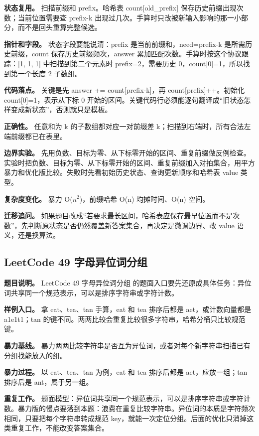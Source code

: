 \textbf{状态复用。} 扫描前缀和 prefix。哈希表 count[old\_prefix] 保存历史前缀出现次数；当前位置需要查 prefix-k 出现过几次。手算时只改被新输入影响的那一小部分，而不是回头重算完整候选。

\textbf{指针和字段。} 状态字段要能说清：prefix 是当前前缀和，need=prefix-k 是所需历史前缀，count 保存历史前缀频次，answer 累加匹配次数。手算时按这个协议跟踪：[1, 1, 1] 中扫描到第二个元素时 prefix=2，需要历史 0，count[0]=1，所以找到第一个长度 2 子数组。

\textbf{代码落点。} 关键是先 answer += count[prefix-k]，再 count[prefix]++。初始化 count[0]=1，表示从下标 0 开始的区间。关键代码行必须能逐句翻译成“旧状态怎样变成新状态”，否则就只是模板。

\textbf{正确性。} 任意和为 k 的子数组都对应一对前缀差 k；扫描到右端时，所有合法左端前缀都已在表里。

\textbf{边界实验。} 先用负数、目标为零、从下标零开始的区间、重复前缀做反例检查。实验时把负数、目标为零、从下标零开始的区间、重复前缀加入对拍集合，用平方暴力和优化版比较。失败时先看初始历史状态、查询更新顺序和哈希表 value 类型。

\textbf{复杂度变化。} 暴力 O(\ensuremath{n^{2}})，前缀哈希 O(n) 均摊时间、O(n) 空间。

\textbf{迁移追问。} 如果题目改成“若要求最长区间，哈希表应保存最早位置而不是次数”，先判断原状态是否仍然覆盖新答案集合，再决定是微调边界、改 value 语义，还是换算法。

\subsection{LeetCode 49 字母异位词分组}

\textbf{题目说明。} LeetCode 49 字母异位词分组 的题面入口要先还原成具体任务：异位词共享同一个规范表示，可以是排序字符串或字符计数。

\textbf{样例入口。} 拿 eat、tea、tan 手算，eat 和 tea 排序后都是 aet，或计数向量都是 a1e1t1；tan 的键不同。两两比较会重复比较很多字符串，哈希分桶只比较规范键。

\textbf{暴力基线。} 暴力两两比较字符串是否互为异位词，或者对每个新字符串扫描已有分组找能放入的组。

\textbf{暴力过程。} 以 eat、tea、tan 为例，eat 和 tea 排序后都是 aet，应放一组；tan 排序后是 ant，属于另一组。

\textbf{重复工作。} 题面模型：异位词共享同一个规范表示，可以是排序字符串或字符计数。暴力版的慢点要落到本题：浪费在重复比较字符串。异位词的本质是字符频次相同，只要把每个字符串转成规范 key，就能一次定位分组。后面的优化只消掉这类重复工作，不能改变答案集合。

